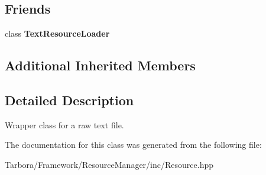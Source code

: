 \subsection*{Friends}
\begin{DoxyCompactItemize}
\item 
\mbox{\label{classTarbora_1_1Text_ad100d8767ed491d6e80636c2b83ac605}} 
class {\bfseries Text\+Resource\+Loader}
\end{DoxyCompactItemize}
\subsection*{Additional Inherited Members}


\subsection{Detailed Description}
Wrapper class for a raw text file. 

The documentation for this class was generated from the following file\+:\begin{DoxyCompactItemize}
\item 
Tarbora/\+Framework/\+Resource\+Manager/inc/Resource.\+hpp\end{DoxyCompactItemize}
